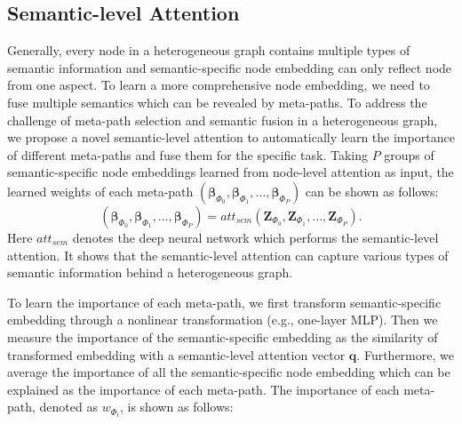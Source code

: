 \subsection{Semantic-level Attention}
Generally, every node in a heterogeneous graph contains multiple types of semantic information and semantic-specific node embedding can only reflect node
from one aspect.
To learn a more comprehensive node embedding, we need to
fuse multiple semantics which can be revealed by meta-paths. To address the challenge of meta-path selection and semantic fusion in a heterogeneous graph, we propose a novel semantic-level attention to 
automatically learn the importance of different meta-paths and fuse them for the specific task. 
Taking  $P$ groups of semantic-specific node embeddings learned from node-level attention as input, the learned weights of each meta-path $(\mathbf{\beta}_{\Phi_0},\mathbf{\beta}_{\Phi_1},\ldots,\mathbf{\beta}_{\Phi_{P}})$ can be shown as follows:
\begin{equation}
(\mathbf{\beta}_{\Phi_0},\mathbf{\beta}_{\Phi_1},\ldots,\mathbf{\beta}_{\Phi_{P}})=att_{sem}(\mathbf{Z}_{\Phi_0},\mathbf{Z}_{\Phi_1},\ldots,\mathbf{Z}_{\Phi_{P}}).
\end{equation}
Here $att_{sem}$ denotes the deep neural network which performs the semantic-level attention. 
It shows that the semantic-level attention can capture various types of semantic information behind a heterogeneous graph.

To learn the importance of each meta-path, we first transform semantic-specific embedding through a nonlinear transformation (e.g., one-layer MLP). Then we measure the importance of the semantic-specific embedding as the similarity of transformed embedding with a semantic-level attention vector $\mathbf{q}$. Furthermore, we average the importance of all the semantic-specific node embedding which can be explained as  the importance of each meta-path.
The importance of each meta-path, denoted as $w_{\Phi_i}$, is shown as follows:

